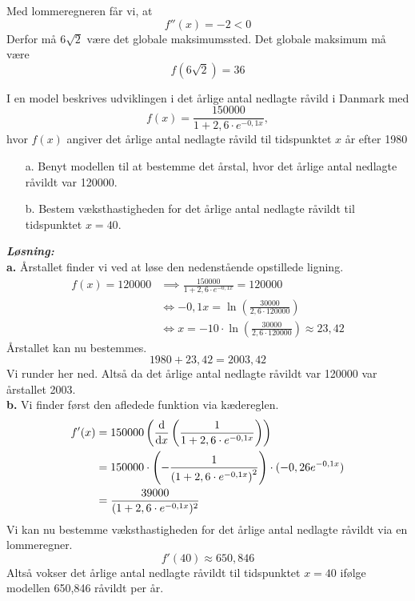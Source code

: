 \documentclass{report}
\newcommand{\sol}{\setlength{\parindent}{0cm}\textbf{\textit{Løsning:}}\setlength{\parindent}{1cm}}
\begin{document}
Med lommeregneren får vi, at
\[
f''(x)=-2<0
\] 
Derfor må $6 \sqrt{2} $ være det globale maksimumssted.
Det globale maksimum må være
\[
f(6 \sqrt{2} )= 36
\] 
\begin{question}{}{}
I en model beskrives udviklingen i det årlige antal nedlagte råvild i Danmark med 
\[
  f(x)= \frac{150000}{1+2,6\cdot e^{-0,1x}},
\] 
  hvor $f(x)$ angiver det årlige antal nedlagte råvild til tidspunktet $x$ år efter 1980
\begin{itemize}
  \item[a.] Benyt modellen til at bestemme det årstal, hvor det årlige antal nedlagte råvildt var 120000.
  \item[b.] Bestem væksthastigheden for det årlige antal nedlagte råvildt til tidspunktet $x=40$.
\end{itemize}
\end{question}
\sol \\ 
\textbf{a.} Årstallet finder vi ved at løse den nedenstående opstillede ligning.
\begin{equation*}
\begin{split}
  f(x)= 120000 &\implies \frac{150000}{1+2,6\cdot e^{-0,1x}}=120000 \\ 
  &\iff -0,1x = \ln(\frac{30000}{2,6\cdot 120000}) \\ 
  &\iff x=-10\cdot \ln(\frac{30000}{2,6\cdot 120000}) \approx 23,42
\end{split}
\end{equation*}
Årstallet kan nu bestemmes.
\[
1980 + 23,42 = 2003,42
\] 
Vi runder her ned. Altså da det årlige antal nedlagte råvildt var 120000 var årstallet 2003. \\[1ex]
\textbf{b.} Vi finder først den afledede funktion via kædereglen.
\begin{equation*}
\begin{split}
  f'(x)&=150000 \left(\dv{x} \left(\frac{1}{1+2,6\cdot e^{-0,1x}}\right)\right) \\ 
  &=150000 \cdot \left(-\frac{1}{\left(1+2,6 \cdot e^{-0,1x}\right)^2}\right)\cdot (-0,26 e^{-0,1x})\\ 
  &= \frac{39000}{(1+2,6\cdot e^{-0,1x})^2}
\end{split}
\end{equation*}
Vi kan nu bestemme væksthastigheden for det årlige antal nedlagte råvildt via en lommeregner.
\[
f'(40)\approx 650,846
\] 
Altså vokser det årlige antal nedlagte råvildt til tidspunktet $x=40$ ifølge modellen 650,846 råvildt per år. 
\end{document}

